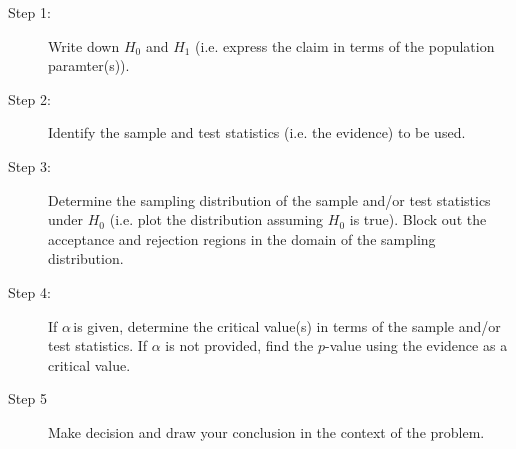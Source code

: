 \documentclass[12pt]{book}
\begin{document}
\begin{description}
\item[Step 1:]  Write down $H_{0}$ and $H_{1}$ (i.e. express the claim in
terms of the population paramter(s)).

\item[Step 2:]  Identify the sample and test statistics (i.e. the evidence)
to be used.

\item[Step 3:]  Determine the sampling distribution of the sample and/or
test statistics under $H_{0}$ (i.e. plot the distribution assuming $H_{0}$
is true). Block out the acceptance and rejection regions in the domain of
the sampling distribution.

\item[Step 4:]  If $\alpha \,$is given, determine the critical value(s) in
terms of the sample and/or test statistics. If $\alpha $ is not provided,
find the $p$-value using the evidence as a critical value.

\item[Step 5]  Make decision and draw your conclusion in the context of the
problem.
\end{description}
\end{document}
